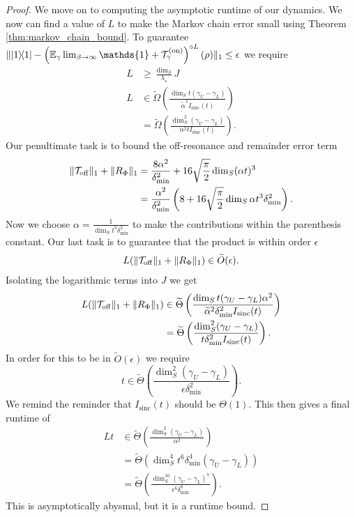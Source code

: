 \documentclass{article}
\newcommand{\on}{\rm on}
\newcommand{\off}{\rm off}
\newcommand{\ketbra}[2]{| #1\rangle\! \langle #2|}
\newcommand{\parens}[1]{\left( #1 \right)}
\newcommand{\norm}[1]{\| #1 \|}
\newcommand{\EE}{\mathbb{E}}
\newcommand{\TT}{\mathcal{T}}
\newcommand{\identity}{\mathds{1}}
\DeclareMathOperator{\sinc}{sinc}
\begin{document}
\begin{proof}
We move on to computing the asymptotic runtime of our dynamics. We now can find a value of $L$ to make the Markov chain error small using Theorem \ref{thm:markov_chain_bound}. To guarantee $\norm{\ketbra{1}{1} - \left(\EE_\gamma \lim_{\beta \to \infty} \identity + \TT_\gamma^{(\on)}\right)^{\circ L}(\rho)}_1 \le \epsilon$ we require
\begin{align}
    L &\ge \frac{\dim_S}{\lambda_\star} J \\
    L &\in \widetilde{\Omega} \left( \frac{\dim_S t (\gamma_U - \gamma_L)}{\widetilde{\alpha}^2 I_{\sinc}(t)} \right) \\
    &= \widetilde{\Omega} \left( \frac{\dim_S^2 (\gamma_U - \gamma_L)}{\alpha^2 t I_{\sinc}(t)}\right).
\end{align}
Our penultimate task is to bound the off-resonance and remainder error term
\begin{align}
    \norm{\TT_{\off}}_1 + \norm{R_{\Phi}}_1 &= \frac{8 \alpha^2}{\delta_{\min}^2} + 16 \sqrt{\frac{\pi}{2}} \dim_S (\alpha t)^3 \\
    &= \frac{\alpha^2}{\delta_{\min}^2} \left(8 + 16 \sqrt{\frac{\pi}{2}} \dim_S \alpha t^3 \delta_{\min}^2 \right).
\end{align}
Now we choose $\alpha = \frac{1}{\dim_S t^3 \delta_{\min}^2}$ to make the contributions within the parenthesis constant. Our last task is to guarantee that the product is within order $\epsilon$
\begin{align}
    L(\norm{\TT_{\off}}_1  + \norm{R_{\Phi}}_1) \in \widetilde{O}(\epsilon).
\end{align}
Isolating the logarithmic terms into $J$ we get
\begin{align}
    L(\norm{\TT_{\off}}_1  + \norm{R_{\Phi}}_1) &\in \widetilde{\Theta}\parens{\frac{\dim_S t(\gamma_U - \gamma_L) \alpha^2}{\widetilde{\alpha}^2 \delta_{\min}^2 I_{\sinc}(t)}} \\
    &= \widetilde{\Theta}\parens{\frac{\dim_S^2 (\gamma_U - \gamma_L)}{t \delta_{\min}^2 I_{\sinc}(t)}}.
\end{align}
In order for this to be in $\widetilde{O}(\epsilon)$ we require
\begin{equation}
    t \in \widetilde{\Theta} \parens{ \frac{\dim_S^2 (\gamma_U - \gamma_L)}{\epsilon \delta_{\min}^2} }.\label{eq:ground_state_prep_time}
\end{equation}
We remind the reminder that $I_{\sinc}(t)$ should be $\Theta(1)$. This then gives a final runtime of
\begin{align}
    Lt &\in \widetilde{\Theta} \parens{\frac{\dim_S^2 (\gamma_U - \gamma_L)}{\alpha^2}} \\
    &= \widetilde{\Theta} \parens{\dim_S^4 t^6 \delta_{\min}^4 (\gamma_U - \gamma_L)} \\
    &= \widetilde{\Theta} \parens{\frac{\dim_S^{16} (\gamma_U - \gamma_L)^7}{\epsilon^{6} \delta_{\min}^8}}.
\end{align}
This is asymptotically abysmal, but it is a runtime bound.


\end{proof}
\end{document}
